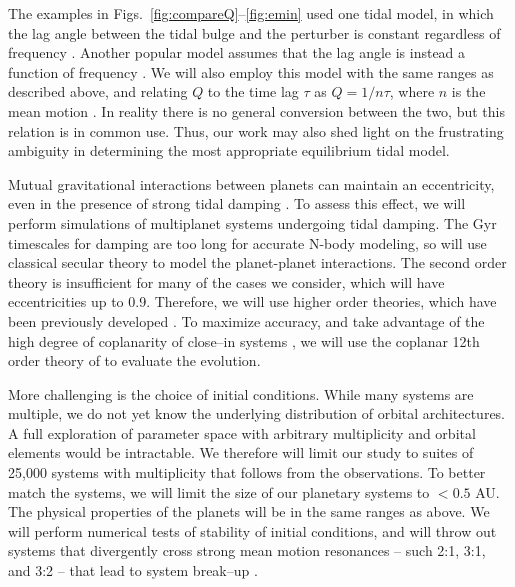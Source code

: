 The examples in Figs.~\ref{fig:compareQ}--\ref{fig:emin} used one
tidal model, in which the lag angle between the tidal bulge and the
perturber is constant regardless of frequency
\citep[e.g.][]{GoldreichSoter66,Jackson08}.  Another popular model
assumes that the lag angle is instead a function of frequency
\citep[e.g.][]{Hut81,Matsumura10}.  We will also employ this model
with the same ranges as described above, and relating $Q$ to the time
lag $\tau$ as $Q = 1/n\tau$, where $n$ is the mean motion
\citep[e.g.][]{Correia12}.  In reality there is no general conversion between
the two, but this relation is in common use.  Thus, our work may also
shed light on the frustrating ambiguity in determining the most
appropriate equilibrium tidal model.

\medskip
{\centerline{}}
\smallskip

Mutual
gravitational interactions between planets can maintain an
eccentricity, even in the presence of strong tidal damping
\citep{MardlingLin02,GreenbergVanLaerhoven11,Correia12}.  To assess this effect, we
will perform simulations of multiplanet systems undergoing tidal
damping. The Gyr 
timescales for damping are too long for accurate N-body modeling, so will use classical secular theory to model the planet-planet interactions. The second order theory is
insufficient for many of the cases we consider, which will have
eccentricities up to 0.9.  Therefore, we will use higher order
theories, which have been previously developed
\citep[e.g.][]{Ford00,VerasArmitage04,LibertHenrard05}. To maximize accuracy, and take advantage of the high degree of coplanarity of close--in
\kepler systems \cite{Fabrycky12}, we will use the coplanar 12th order theory of \cite{LibertHenrard05} to evaluate
the evolution.

More challenging is the choice of initial conditions.  While many
\kepler systems are multiple, we do not yet know the underlying
distribution of orbital architectures.  A full exploration of
parameter space with arbitrary multiplicity and orbital elements would
be intractable.  We
therefore will limit our study to suites of 25,000 systems with
multiplicity that follows from the observations.  To better match
the \kepler systems, we will limit the size of our planetary systems
to $<0.5$ AU. The physical properties of the planets will be in the
same ranges as above. We will perform numerical tests of stability of
initial conditions, and will throw out systems that divergently cross
strong mean motion resonances -- such 2:1, 3:1, and 3:2 -- that lead
to system break--up \citep[e.g.][]{Gomes05}.

